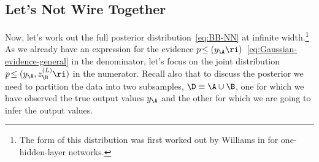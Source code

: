 \subsection{Let's Not Wire Together}\label{subsec:absence-FF-Bayes}
Now, let's work out the full posterior distribution~\eqref{eq:BB-NN} at infinite width.\footnote{
    The form of this distribution was first worked out by Williams in \cite{williams-infinite} for one-hidden-layer networks.
} As we already have an expression for the evidence $p\!\le(y_{\A}\ri)$~\eqref{eq:Gaussian-evidence-general} in the denominator, let's focus on the joint distribution $p\!\le(y_{\A},z_{\B}^{(L)}\ri)$ in the numerator. Recall also that to discuss the posterior we need to partition the data into two subsamples, $\D\equiv\A\cup\B$, one for which we have observed the true output values $y_{\A}$ and the other for which we are going to infer the output values. 

